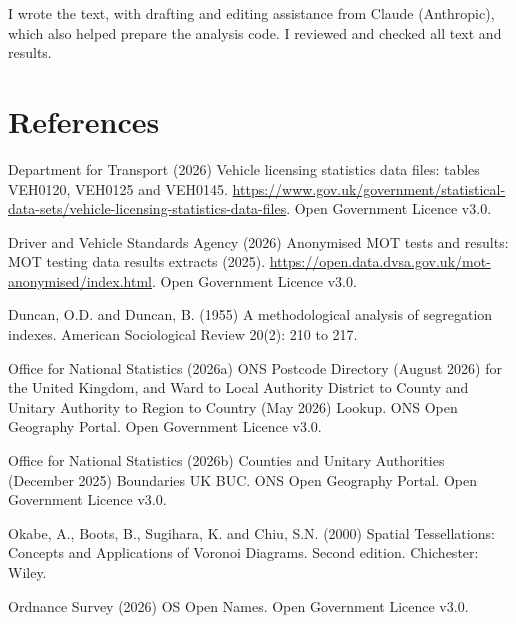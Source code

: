 \documentclass[11pt,a4paper]{article}
\begin{document}
I wrote the text, with drafting and editing assistance from Claude (Anthropic), which also helped prepare the analysis code. I reviewed and checked all text and results.

\section*{References}
\small
Department for Transport (2026) Vehicle licensing statistics data files: tables VEH0120, VEH0125 and VEH0145. \url{https://www.gov.uk/government/statistical-data-sets/vehicle-licensing-statistics-data-files}. Open Government Licence v3.0.

Driver and Vehicle Standards Agency (2026) Anonymised MOT tests and results: MOT testing data results extracts (2025). \url{https://open.data.dvsa.gov.uk/mot-anonymised/index.html}. Open Government Licence v3.0.

Duncan, O.D. and Duncan, B. (1955) A methodological analysis of segregation indexes. American Sociological Review 20(2): 210 to 217.

Office for National Statistics (2026a) ONS Postcode Directory (August 2026) for the United Kingdom, and Ward to Local Authority District to County and Unitary Authority to Region to Country (May 2026) Lookup. ONS Open Geography Portal. Open Government Licence v3.0.

Office for National Statistics (2026b) Counties and Unitary Authorities (December 2025) Boundaries UK BUC. ONS Open Geography Portal. Open Government Licence v3.0.

Okabe, A., Boots, B., Sugihara, K. and Chiu, S.N. (2000) Spatial Tessellations: Concepts and Applications of Voronoi Diagrams. Second edition. Chichester: Wiley.

Ordnance Survey (2026) OS Open Names. Open Government Licence v3.0.
\end{document}
